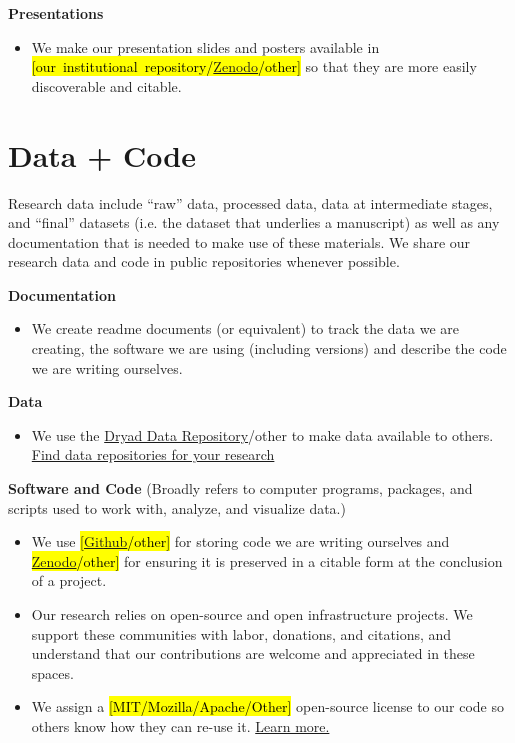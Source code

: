 \documentclass{article}
\begin{document}
\textbf{Presentations}
\begin{itemize}
\item We make our presentation slides and posters available in \hl{\hbox{[our institutional repository/\href{https://zenodo.org/}{Zenodo}/other]}} so that they are more easily discoverable and citable. 
\end{itemize}


\section*{\textcolor{myGreen}{Data + Code}}
Research data include “raw” data, processed data, data at intermediate stages, and “final” datasets (i.e. the dataset that underlies a manuscript) as well as any documentation that is needed to make use of these materials. We share our research data and code in public repositories whenever possible.

\textbf{Documentation}
\begin{itemize}
    \item We create readme documents (or equivalent) to track the data we are creating, the software we are using (including versions) and describe the code we are writing ourselves.  
\end{itemize}

\textbf{Data} 
\begin{itemize}
\item We use the \href{https://datadryad.org/stash}{Dryad Data Repository}/other to make data available to others. \href{https://www.nature.com/sdata/policies/repositories}{Find data repositories for your research}
\end{itemize}

\textbf{Software and Code} (Broadly refers to computer programs, packages, and scripts used to work with, analyze, and visualize data.)  
\begin{itemize}
\item We use \hl{\hbox{[\href{https://github.com/}{Github}/other]}} for storing code we are writing ourselves and \hl{\hbox{\href{https://zenodo.org/}{Zenodo}/other]}} for ensuring it is preserved in a citable form at the conclusion of a project. 
\item Our research relies on open-source and open infrastructure projects. We support these communities with labor, donations, and citations, and understand that our contributions are welcome and appreciated in these spaces. 
\item We assign a \hl{[MIT/Mozilla/Apache/Other]} open-source license to our code so others know how they can re-use it. \href{https://choosealicense.com/licenses/}{Learn more.}
\end{itemize}
\end{document}
